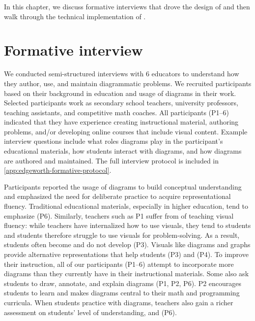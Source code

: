 In this chapter, we discuss formative interviews that drove the design of \Edgeworth{} and then walk through the technical implementation of \Edgeworth.

\section{Formative interview}

\label{sec:edgeworth-formative}

We conducted semi-structured interviews with 6 educators to understand how they author, use, and maintain diagrammatic problems. We recruited participants based on their background in education and usage of diagrams in their work. Selected participants work as secondary school teachers, university professors, teaching assistants, and competitive math coaches. All participants (P1--6) indicated that they have experience creating instructional material, authoring problems, and/or developing online courses that include visual content. Example interview questions include what roles diagrams play in the participant's educational materials, how students interact with diagrams, and how diagrams are authored and maintained. 
The full interview protocol is included in \cref{app:edgeworth-formative-protocol}.

Participants reported the usage of diagrams to build conceptual understanding and emphasized the need for deliberate practice to acquire representational fluency. Traditional educational materials, especially in higher education, tend to emphasize  (P6).  Similarly, teachers such as P1 suffer from  of teaching visual fluency: while teachers have internalized how to use visuals, they tend to  students and students therefore struggle to use visuals for problem-solving.  As a result, students often become  and do not develop  (P3). Visuals like diagrams and graphs provide alternative representations that help students  (P3) and  (P4). To improve their instruction, all of our participants (P1--6) attempt to incorporate more diagrams than they currently have in their instructional materials. Some also ask students to draw, annotate, and explain diagrams (P1, P2, P6). P2 encourages students to learn  and makes diagrams central to their math and programming curricula. When students practice with diagrams, teachers also gain a richer assessment on students' level of understanding, and  (P6).

